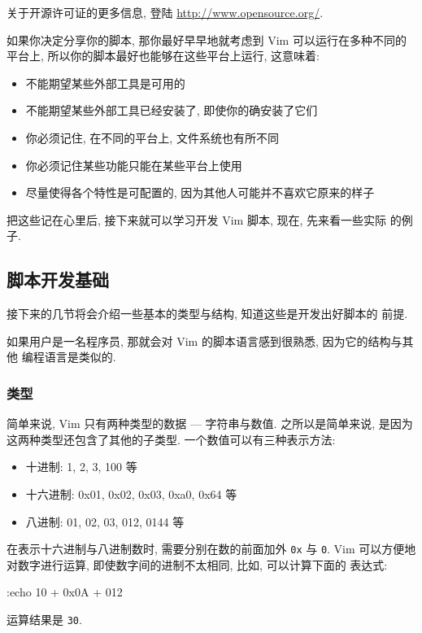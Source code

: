 \begin{warning}
    关于开源许可证的更多信息, 登陆 \url{http://www.opensource.org/}.
\end{warning}

如果你决定分享你的脚本, 那你最好早早地就考虑到 Vim 可以运行在多种不同的平台上,
所以你的脚本最好也能够在这些平台上运行, 这意味着:
\begin{itemize}
    \item 不能期望某些外部工具是可用的
    \item 不能期望某些外部工具已经安装了, 即使你的确安装了它们
    \item 你必须记住, 在不同的平台上, 文件系统也有所不同
    \item 你必须记住某些功能只能在某些平台上使用
    \item 尽量使得各个特性是可配置的, 因为其他人可能并不喜欢它原来的样子
\end{itemize}

把这些记在心里后, 接下来就可以学习开发 Vim 脚本, 现在, 先来看一些实际
的例子.

\subsection{脚本开发基础}
\label{subsec:script_writing_basics}

接下来的几节将会介绍一些基本的类型与结构, 知道这些是开发出好脚本的
前提.

如果用户是一名程序员, 那就会对 Vim 的脚本语言感到很熟悉, 因为它的结构与其他
编程语言是类似的.

\subsubsection{类型}
\label{subsubsec:types}

简单来说, Vim 只有两种类型的数据 --- 字符串与数值. 之所以是简单来说, 是因为
这两种类型还包含了其他的子类型. 一个数值可以有三种表示方法:
\begin{itemize}
    \item 十进制: 1, 2, 3, 100 等
    \item 十六进制: 0x01, 0x02, 0x03, 0xa0, 0x64 等
    \item 八进制: 01, 02, 03, 012, 0144 等
\end{itemize}

在表示十六进制与八进制数时, 需要分别在数的前面加外 \texttt{0x} 与 \texttt{0}.
Vim 可以方便地对数字进行运算, 即使数字间的进制不太相同, 比如, 可以计算下面的
表达式:
\begin{vimcode}
:echo 10 + 0x0A + 012
\end{vimcode}
运算结果是 \texttt{30}.

